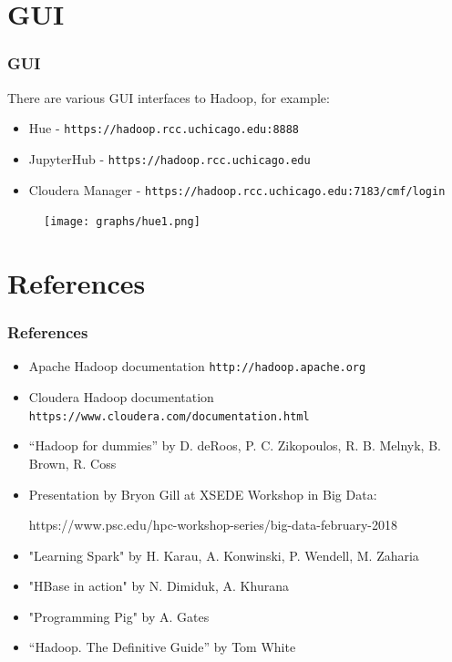 \documentclass{beamer}
\begin{document}
\section{GUI}
\begin{frame}[fragile]
  \frametitle{GUI}
  There are various GUI interfaces to Hadoop, for example:
  \begin{itemize}
    \item Hue - {\color{mycolorcli}\verb|https://hadoop.rcc.uchicago.edu:8888|}
    \item JupyterHub - {\color{mycolorcli}\verb|https://hadoop.rcc.uchicago.edu|}
    \item Cloudera Manager - {\color{mycolorcli}\verb|https://hadoop.rcc.uchicago.edu:7183/cmf/login|}
  \end{itemize}
 \begin{figure}[h]
 \texttt{[image: graphs/hue1.png]}
 \end{figure}

\end{frame}


\section{References}
\begin{frame}[fragile]
 \frametitle{References}
 \begin{itemize}
 \item Apache Hadoop documentation {\color{mycolorcli}\verb|http://hadoop.apache.org|}
 \item Cloudera Hadoop documentation {\color{mycolorcli}\verb|https://www.cloudera.com/documentation.html|}
  \item ``Hadoop for dummies'' by D. deRoos, P. C. Zikopoulos, R. B. Melnyk, B. Brown, R. Coss
  \item Presentation by Bryon Gill at XSEDE Workshop in Big Data: 
{\color{mycolorcli}
  \begin{verbnobox}[\small]
https://www.psc.edu/hpc-workshop-series/big-data-february-2018
  \end{verbnobox}
}
  \item "Learning Spark" by H. Karau, A. Konwinski, P. Wendell, M. Zaharia
  \item "HBase in action" by N. Dimiduk, A. Khurana
  \item "Programming Pig" by A. Gates
  \item ``Hadoop. The Definitive Guide'' by Tom White
 \end{itemize}

\end{frame}
\end{document}
